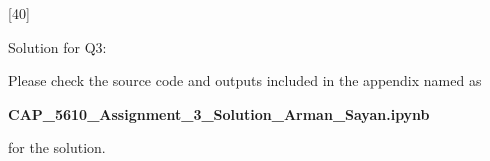 \documentclass[12pt,letterpaper, onecolumn]{exam}
\begin{document}
\begin{questions}
    [40]

    Solution for Q3:

    \begin{solution}

        Please check the source code and outputs included in the appendix named as

        \begin{center}
            \textbf{CAP\_5610\_Assignment\_3\_Solution\_Arman\_Sayan.ipynb}
        \end{center}
        
        for the solution.
    \end{solution}

    \pagebreak
    
\end{questions}

%      
\end{document}
